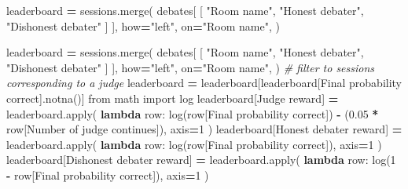 \documentclass[
]{article}
\newenvironment{Shaded}{\begin{snugshade}}{\end{snugshade}}
\newcommand{\BuiltInTok}[1]{#1}
\newcommand{\CommentTok}[1]{\textcolor[rgb]{0.56,0.35,0.01}{\textit{#1}}}
\newcommand{\DecValTok}[1]{\textcolor[rgb]{0.00,0.00,0.81}{#1}}
\newcommand{\FloatTok}[1]{\textcolor[rgb]{0.00,0.00,0.81}{#1}}
\newcommand{\ImportTok}[1]{#1}
\newcommand{\KeywordTok}[1]{\textcolor[rgb]{0.13,0.29,0.53}{\textbf{#1}}}
\newcommand{\NormalTok}[1]{#1}
\newcommand{\OperatorTok}[1]{\textcolor[rgb]{0.81,0.36,0.00}{\textbf{#1}}}
\newcommand{\StringTok}[1]{\textcolor[rgb]{0.31,0.60,0.02}{#1}}
\begin{document}
\begin{Shaded}
\begin{Highlighting}[]
\NormalTok{leaderboard }\OperatorTok{=}\NormalTok{ sessions.merge(}
\NormalTok{        debates[}
\NormalTok{            [}
                \StringTok{"Room name"}\NormalTok{,}
                \StringTok{"Honest debater"}\NormalTok{,}
                \StringTok{"Dishonest debater"}
\NormalTok{            ]}
\NormalTok{        ],}
\NormalTok{        how}\OperatorTok{=}\StringTok{"left"}\NormalTok{,}
\NormalTok{        on}\OperatorTok{=}\StringTok{"Room name"}\NormalTok{,}
\NormalTok{    )}



\NormalTok{leaderboard }\OperatorTok{=}\NormalTok{ sessions.merge(}
\NormalTok{        debates[}
\NormalTok{            [}
                \StringTok{"Room name"}\NormalTok{,}
                \StringTok{"Honest debater"}\NormalTok{,}
                \StringTok{"Dishonest debater"}
\NormalTok{            ]}
\NormalTok{        ],}
\NormalTok{        how}\OperatorTok{=}\StringTok{"left"}\NormalTok{,}
\NormalTok{        on}\OperatorTok{=}\StringTok{"Room name"}\NormalTok{,}
\NormalTok{    )}
\CommentTok{\# filter to sessions corresponding to a judge}
\NormalTok{leaderboard }\OperatorTok{=}\NormalTok{ leaderboard[leaderboard[}\StringTok{\textquotesingle{}Final probability correct\textquotesingle{}}\NormalTok{].notna()]}
\ImportTok{from}\NormalTok{ math }\ImportTok{import}\NormalTok{ log}
\NormalTok{leaderboard[}\StringTok{\textquotesingle{}Judge reward\textquotesingle{}}\NormalTok{] }\OperatorTok{=}\NormalTok{ leaderboard.}\BuiltInTok{apply}\NormalTok{(}
    \KeywordTok{lambda}\NormalTok{ row: log(row[}\StringTok{\textquotesingle{}Final probability correct\textquotesingle{}}\NormalTok{]) }\OperatorTok{{-}}\NormalTok{ (}\FloatTok{0.05} \OperatorTok{*}\NormalTok{ row[}\StringTok{\textquotesingle{}Number of judge continues\textquotesingle{}}\NormalTok{]),}
\NormalTok{    axis}\OperatorTok{=}\DecValTok{1}
\NormalTok{)}
\NormalTok{leaderboard[}\StringTok{\textquotesingle{}Honest debater reward\textquotesingle{}}\NormalTok{] }\OperatorTok{=}\NormalTok{ leaderboard.}\BuiltInTok{apply}\NormalTok{(}
    \KeywordTok{lambda}\NormalTok{ row: log(row[}\StringTok{\textquotesingle{}Final probability correct\textquotesingle{}}\NormalTok{]),}
\NormalTok{    axis}\OperatorTok{=}\DecValTok{1}
\NormalTok{)}
\NormalTok{leaderboard[}\StringTok{\textquotesingle{}Dishonest debater reward\textquotesingle{}}\NormalTok{] }\OperatorTok{=}\NormalTok{ leaderboard.}\BuiltInTok{apply}\NormalTok{(}
    \KeywordTok{lambda}\NormalTok{ row: log(}\DecValTok{1} \OperatorTok{{-}}\NormalTok{ row[}\StringTok{\textquotesingle{}Final probability correct\textquotesingle{}}\NormalTok{]),}
\NormalTok{    axis}\OperatorTok{=}\DecValTok{1}
\NormalTok{)}
\end{Highlighting}
\end{Shaded}
\end{document}
